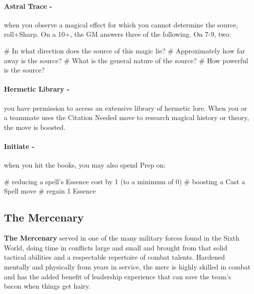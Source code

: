 \paragraph{Astral Trace -} when you observe a magical effect for which you cannot determine the source, roll+Sharp. On a 10+, the GM answers three of the following. On 7-9, two:
    \begin{easylist}
        # In what direction does the source of this magic lie?
        # Approximately how far away is the source?
        # What is the general nature of the source?
        # How powerful is the source?
    \end{easylist}

\paragraph{Hermetic Library -} you have permission to access an extensive library of hermetic lore. When you or a teammate uses the Citation Needed move to research magical history or theory, the move is boosted.

\paragraph{Initiate -} when you hit the books, you may also spend Prep on:
    \begin{easylist}
        # reducing a spell’s Essence cost by 1 (to a minimum of 0)
        # boosting a Cast a Spell move
        # regain 1 Essence
    \end{easylist}


\clearpage
\subsection{The Mercenary}
\textbf{The Mercenary} served in one of the many military forces found in the Sixth World, doing time in conflicts large and small and brought from that solid tactical abilities and a respectable repertoire of combat talents. Hardened mentally and physically from years in service, the merc is highly skilled in combat and has the added benefit of leadership experience that can save the team’s bacon when things get hairy.

